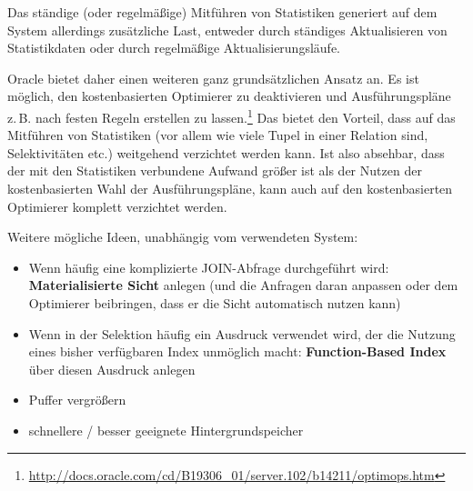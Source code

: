 \begin{solution}
    Das ständige (oder regelmäßige) Mitführen von Statistiken generiert
    auf dem System allerdings zusätzliche Last,
    entweder durch ständiges Aktualisieren von Statistikdaten
    oder durch regelmäßige Aktualisierungsläufe.

    Oracle bietet daher einen weiteren ganz grundsätzlichen Ansatz an.
    Es ist möglich, den kostenbasierten Optimierer zu deaktivieren
    und Ausführungspläne z.\,B. nach festen Regeln erstellen zu
    lassen.\footnote{\url{http://docs.oracle.com/cd/B19306_01/server.102/b14211/optimops.htm}}
    Das bietet den Vorteil, dass auf das Mitführen von Statistiken
    (vor allem wie viele Tupel in einer Relation sind, Selektivitäten etc.)
    weitgehend verzichtet werden kann.
    Ist also absehbar,
    dass der mit den Statistiken verbundene Aufwand größer ist
    als der Nutzen der kostenbasierten Wahl der Ausführungspläne,
    kann auch
    auf den kostenbasierten Optimierer komplett verzichtet werden.

    Weitere mögliche Ideen, unabhängig vom verwendeten System:
    \begin{itemize}
        \item Wenn häufig eine komplizierte JOIN-Abfrage durchgeführt wird:
            \textbf{Materialisierte Sicht} anlegen
            (und die Anfragen daran anpassen oder dem Optimierer beibringen,
            dass er die Sicht automatisch nutzen kann)
        \item Wenn in der Selektion häufig ein Ausdruck verwendet wird,
            der die Nutzung eines bisher verfügbaren Index unmöglich macht:
            \textbf{Function-Based Index} über diesen Ausdruck anlegen
        \item Puffer vergrößern
        \item schnellere / besser geeignete Hintergrundspeicher
    \end{itemize}
\end{solution}
